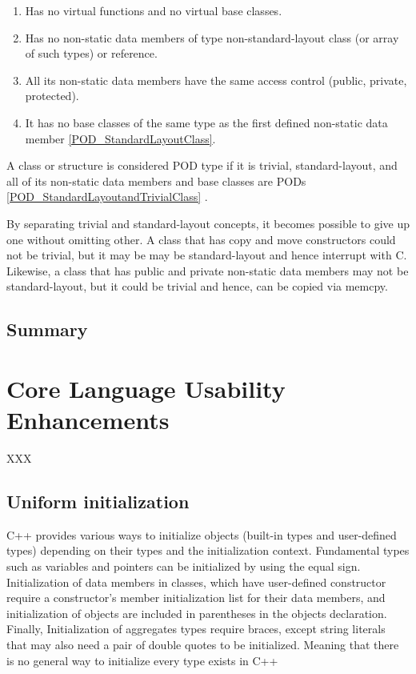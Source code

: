 \documentclass[11pt]{report}
\begin{document}
\begin{enumerate}
\item	Has no virtual functions and no virtual base classes.
\item	Has no non-static data members of type non-standard-layout class (or array of such types) or reference.
\item	All its non-static data members have the same access control (public, private, protected).
\item	It has no base classes of the same type as the first defined non-static data member \ref{POD_StandardLayoutClass}.
\end{enumerate}

A class or structure is considered POD type if it is trivial, standard-layout, and all of its non-static data members and base classes are PODs \ref{POD_StandardLayoutandTrivialClass} \cite {ISO:2011:Cpplanguage}.


By separating trivial and standard-layout concepts, it becomes possible to give up one without omitting other. A class that has copy  and move constructors could not be trivial, but it may be may be standard-layout and hence interrupt with C. Likewise, a class that has  public and private non-static data members may not be standard-layout, but it could be trivial and hence, can be copied via memcpy.


\section{Summary}
\label{sec: Summary}


\chapter{Core Language Usability Enhancements}
\label{chapter: Usability Enhancements}
XXX

\section{Uniform initialization}
\label{section:Uniform initialization}
C++ provides various ways to initialize objects (built-in types and user-defined types) depending on their types and the initialization context. Fundamental types such as variables and pointers can be initialized by using the equal sign. Initialization of data members in classes, which have user-defined constructor require a constructor's member initialization list for their data members, and initialization of objects are included in parentheses in the objects declaration. Finally, Initialization of aggregates types require braces, except string literals that may also need a pair of double quotes to be initialized. Meaning that there is no general way to initialize every type exists in C++ \cite{Stroustrup:2012:Cpp11}
\end{document}
